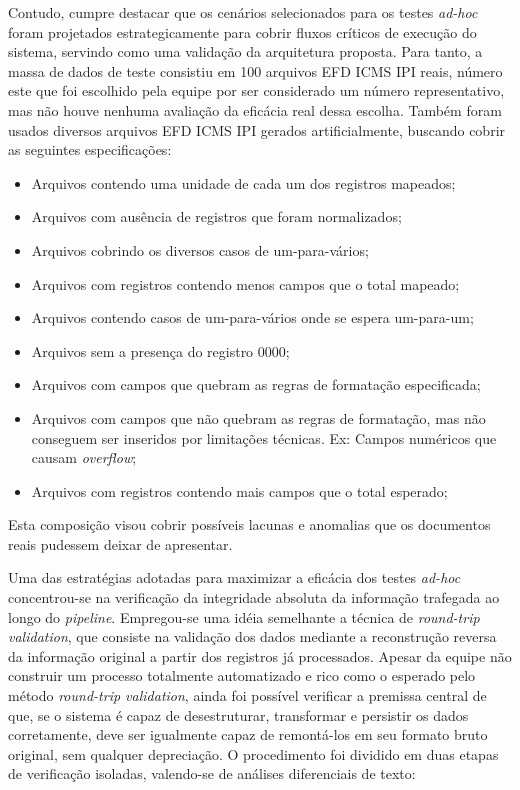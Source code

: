 Contudo, cumpre destacar que os cenários selecionados para os testes
\textit{ad-hoc} foram projetados estrategicamente para cobrir fluxos críticos
de execução do sistema, servindo como uma validação da arquitetura
proposta. Para tanto, a massa de dados de teste consistiu em 100 arquivos
EFD ICMS IPI reais, número este que foi escolhido pela equipe por ser
considerado um número representativo, mas não houve nenhuma avaliação da
eficácia real dessa escolha. Também foram usados diversos arquivos
EFD ICMS IPI gerados artificialmente, buscando cobrir as seguintes
especificações:
\begin{itemize}
    \item Arquivos contendo uma unidade de cada um dos registros mapeados;
    \item Arquivos com ausência de registros que foram normalizados;
    \item Arquivos cobrindo os diversos casos de um-para-vários;
    \item Arquivos com registros contendo menos campos que o total mapeado;
    \item Arquivos contendo casos de um-para-vários onde se espera um-para-um;
    \item Arquivos sem a presença do registro 0000;
    \item Arquivos com campos que quebram as regras de formatação especificada;
    \item Arquivos com campos que não quebram as regras de formatação, mas não
    conseguem ser inseridos por limitações técnicas. Ex: Campos numéricos que
    causam \textit{overflow};
    \item Arquivos com registros contendo mais campos que o total esperado;
\end{itemize}
Esta composição visou cobrir possíveis lacunas e anomalias que
os documentos reais pudessem deixar de apresentar.

Uma das estratégias adotadas para maximizar a eficácia dos testes
\textit{ad-hoc} concentrou-se na verificação da integridade absoluta da
informação trafegada ao longo do \textit{pipeline}. Empregou-se uma idéia
semelhante a técnica de \textit{round-trip validation}, que consiste na
validação dos dados mediante a reconstrução reversa da informação original a
partir dos registros já processados. Apesar da equipe não construir um
processo totalmente automatizado e rico como o esperado pelo método
\textit{round-trip validation}, ainda foi possível verificar a premissa central
de que, se o sistema é capaz de desestruturar, transformar e persistir os dados
corretamente, deve ser igualmente capaz de remontá-los em seu formato bruto
original, sem qualquer depreciação. O procedimento foi dividido em duas etapas
de verificação isoladas, valendo-se de análises diferenciais de texto:

